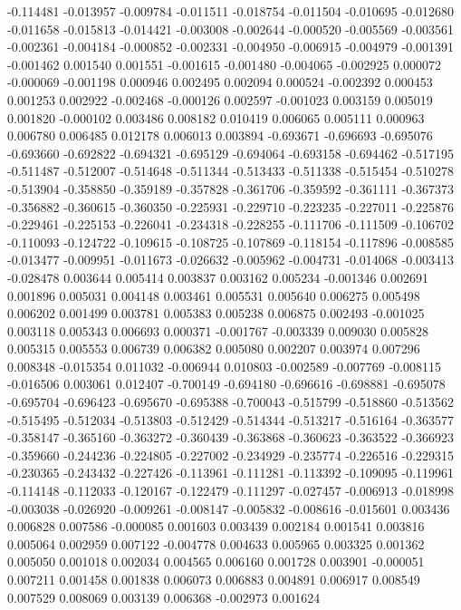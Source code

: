 -0.114481
-0.013957
-0.009784
-0.011511
-0.018754
-0.011504
-0.010695
-0.012680
-0.011658
-0.015813
-0.014421
-0.003008
-0.002644
-0.000520
-0.005569
-0.003561
-0.002361
-0.004184
-0.000852
-0.002331
-0.004950
-0.006915
-0.004979
-0.001391
-0.001462
0.001540
0.001551
-0.001615
-0.001480
-0.004065
-0.002925
0.000072
-0.000069
-0.001198
0.000946
0.002495
0.002094
0.000524
-0.002392
0.000453
0.001253
0.002922
-0.002468
-0.000126
0.002597
-0.001023
0.003159
0.005019
0.001820
-0.000102
0.003486
0.008182
0.010419
0.006065
0.005111
0.000963
0.006780
0.006485
0.012178
0.006013
0.003894
-0.693671
-0.696693
-0.695076
-0.693660
-0.692822
-0.694321
-0.695129
-0.694064
-0.693158
-0.694462
-0.517195
-0.511487
-0.512007
-0.514648
-0.511344
-0.513433
-0.511338
-0.515454
-0.510278
-0.513904
-0.358850
-0.359189
-0.357828
-0.361706
-0.359592
-0.361111
-0.367373
-0.356882
-0.360615
-0.360350
-0.225931
-0.229710
-0.223235
-0.227011
-0.225876
-0.229461
-0.225153
-0.226041
-0.234318
-0.228255
-0.111706
-0.111509
-0.106702
-0.110093
-0.124722
-0.109615
-0.108725
-0.107869
-0.118154
-0.117896
-0.008585
-0.013477
-0.009951
-0.011673
-0.026632
-0.005962
-0.004731
-0.014068
-0.003413
-0.028478
0.003644
0.005414
0.003837
0.003162
0.005234
-0.001346
0.002691
0.001896
0.005031
0.004148
0.003461
0.005531
0.005640
0.006275
0.005498
0.006202
0.001499
0.003781
0.005383
0.005238
0.006875
0.002493
-0.001025
0.003118
0.005343
0.006693
0.000371
-0.001767
-0.003339
0.009030
0.005828
0.005315
0.005553
0.006739
0.006382
0.005080
0.002207
0.003974
0.007296
0.008348
-0.015354
0.011032
-0.006944
0.010803
-0.002589
-0.007769
-0.008115
-0.016506
0.003061
0.012407
-0.700149
-0.694180
-0.696616
-0.698881
-0.695078
-0.695704
-0.696423
-0.695670
-0.695388
-0.700043
-0.515799
-0.518860
-0.513562
-0.515495
-0.512034
-0.513803
-0.512429
-0.514344
-0.513217
-0.516164
-0.363577
-0.358147
-0.365160
-0.363272
-0.360439
-0.363868
-0.360623
-0.363522
-0.366923
-0.359660
-0.244236
-0.224805
-0.227002
-0.234929
-0.235774
-0.226516
-0.229315
-0.230365
-0.243432
-0.227426
-0.113961
-0.111281
-0.113392
-0.109095
-0.119961
-0.114148
-0.112033
-0.120167
-0.122479
-0.111297
-0.027457
-0.006913
-0.018998
-0.003038
-0.026920
-0.009261
-0.008147
-0.005832
-0.008616
-0.015601
0.003436
0.006828
0.007586
-0.000085
0.001603
0.003439
0.002184
0.001541
0.003816
0.005064
0.002959
0.007122
-0.004778
0.004633
0.005965
0.003325
0.001362
0.005050
0.001018
0.002034
0.004565
0.006160
0.001728
0.003901
-0.000051
0.007211
0.001458
0.001838
0.006073
0.006883
0.004891
0.006917
0.008549
0.007529
0.008069
0.003139
0.006368
-0.002973
0.001624
